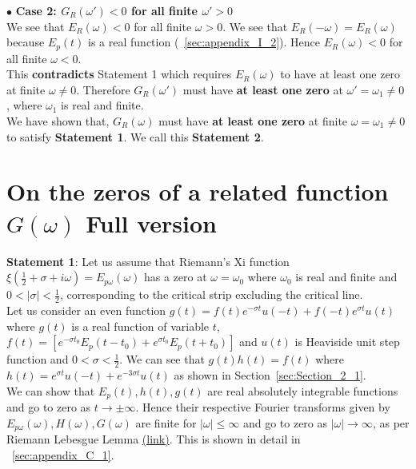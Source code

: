 \documentclass[11pt]{elsarticle}
\begin{document}
$\bullet$ \textbf{\textbf{Case 2:} $G_R(\omega') < 0$ for all finite  $\omega' > 0$ } \\

We see that  $E_{R}(\omega) < 0$ for all finite $\omega > 0$. We see that $E_{R}(-\omega)= E_{R}(\omega)$ because $E_p(t)$ is a real function (~\ref{sec:appendix_I_2}). Hence $E_{R}(\omega) < 0$ for all finite $\omega < 0$.\\


This \textbf{contradicts} Statement 1 which requires $E_{R}(\omega)$ to have at least one zero at finite $\omega \neq 0$. Therefore $G_{R}(\omega')$ must have\textbf{ at least one zero} at $\omega' =  \omega_1 \neq 0$ , where $\omega_{1}$ is real and finite. \\



We have shown that, $G_{R}(\omega)$ must have\textbf{ at least one zero} at finite $\omega =  \omega_1 \neq 0$ to satisfy \textbf{Statement 1}. We call this \textbf{Statement 2}. 



\clearpage
\section{\label{sec:Appendix_D_6} \textbf{ On the zeros of a related function $G(\omega)$ Full version } \protect\\  \lowercase{} }

\textbf{Statement 1}: Let us assume that Riemann's Xi function $\xi(\frac{1}{2} + \sigma + i \omega)= E_{p\omega}(\omega)$ has a zero at $\omega = \omega_{0}$ where $\omega_{0}$ is real and finite and $0 < |\sigma| < \frac{1}{2}$, corresponding to the critical strip excluding the critical line.  \\

Let us consider an even function  $g(t) = f(t) e^{-\sigma t}  u(-t) + f(-t)  e^{\sigma t}  u(t)  $ where $g(t)$ is a real function of variable $t$, $f(t)=[ e^{-\sigma t_0} E_p(t - t_0) +  e^{\sigma t_0} E_p(t + t_0) ]$ and $u(t)$ is Heaviside unit step function and $0 < \sigma < \frac{1}{2}$. We can see that $g(t) h(t) = f(t)$ where $h(t)=  e^{ \sigma t} u(-t) + e^{ - 3 \sigma t} u(t) $ as shown in Section~\ref{sec:Section_2_1}. \\

We can show that $E_p(t), h(t), g(t)$ are real absolutely integrable functions and go to zero as $t \to \pm \infty$. Hence their respective Fourier transforms given by $E_{p\omega}(\omega), H(\omega), G(\omega)$ are finite for $|\omega| \leq \infty$ and go to zero as $|\omega| \to \infty$, as per Riemann Lebesgue Lemma \href{https://en.wikipedia.org/wiki/Riemann-Lebesgue\_lemma}{(link)}. This is shown in detail in ~\ref{sec:appendix_C_1}.\\
\end{document}
